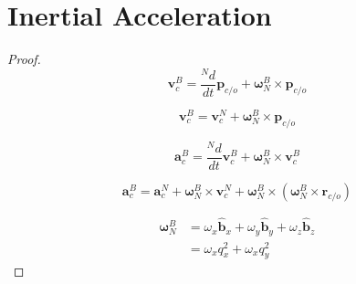 \documentclass{amsart}
\theoremstyle{definition}
\theoremstyle{remark}
\numberwithin{equation}{section}
\begin{document}
\section{Inertial Acceleration}
\begin{proof}
  \begin{equation}
    \mathbf{v}^B_c =\frac{^Nd}{dt} \mathbf{p}_{c/o} + {\boldsymbol\omega^B_N}\times\mathbf{p}_{c/o}
  \end{equation}

  \begin{equation}
    \mathbf{v}^B_c = \mathbf{v}^N_c + {\boldsymbol\omega^B_N}\times\mathbf{p}_{c/o}
  \end{equation}
  
  \begin{equation}
    \mathbf{a}^B_c = \frac{^Nd}{dt} \mathbf{v}^B_c + {\boldsymbol\omega^B_N}\times \mathbf{v}^B_c 
  \end{equation}
  
  \begin{equation}
    \mathbf{a}^B_c = \mathbf{a}^N_c + {\boldsymbol\omega^B_N} \times \mathbf{v}^N_c+ {\boldsymbol\omega^B_N}\times\left({\boldsymbol\omega^B_N}\times\mathbf{r}_{c/o}\right)
  \end{equation}

  \begin{align}
    {\boldsymbol\omega^B_N} &= \omega_x \mathbf{\hat{b}}_x + \omega_y \mathbf{\hat{b}}_y + \omega_z \mathbf{\hat{b}}_z \\
    &=\omega_xq_x^2+\omega_xq_y^2
  \end{align}
\end{proof}
\end{document}
